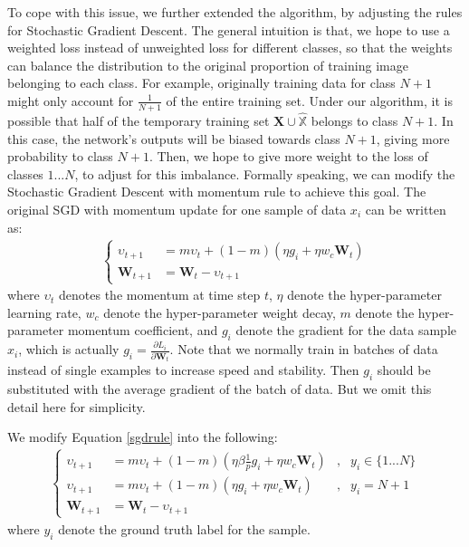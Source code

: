 To cope with this issue, we further extended the algorithm, by adjusting the rules for Stochastic Gradient Descent. The general intuition is that, we hope to use a weighted loss instead of unweighted loss for different classes, so that the weights can balance the distribution to the original proportion of training image belonging to each class. For example, originally training data for class $N+1$ might only account for $\frac{1}{N+1}$ of the entire training set. Under our algorithm, it is possible that half of the temporary training set $\mathbf{X} \cup \hat{\mathbb{X}}$ belongs to class $N+1$. In this case, the network's outputs will be biased towards class $N+1$, giving more probability to class $N+1$. Then, we hope to give more weight to the loss of classes $1...N$, to adjust for this imbalance. Formally speaking, we can modify the Stochastic Gradient Descent with momentum rule to achieve this goal. The original SGD with momentum update for one sample of data $x_i$ can be written as:
\begin{align}
\left\{
\begin{aligned}
	\upsilon_{t+1} &= m\upsilon_t + (1-m)\left( \eta g_i + \eta w_c \mathbf{W}_t \right)\\
	\mathbf{W}_{t+1} &= \mathbf{W}_{t} - \upsilon_{t+1}
\end{aligned}
\right.
\label{sgdrule}
\end{align}
where $\upsilon_t$ denotes the momentum at time step $t$, $\eta$ denote the hyper-parameter learning rate, $w_c$ denote the hyper-parameter weight decay, $m$ denote the hyper-parameter momentum coefficient, and $g_i$ denote the gradient for the data sample $x_i$, which is actually $g_i = \frac{\partial L_i}{\partial \mathbf{W}_t}$. Note that we normally train in batches of data instead of single examples to increase speed and stability. Then $g_i$ should be substituted with the average gradient of the batch of data. But we omit this detail here for simplicity.

We modify Equation \ref{sgdrule} into the following:
\begin{align}
\left\{
\begin{aligned}
\upsilon_{t+1} &= m\upsilon_t + (1-m)\left( \eta\beta\frac{1}{p} g_i + \eta w_c \mathbf{W}_t \right)&, &   y_i \in \{1...N\}\\
\upsilon_{t+1} &= m\upsilon_t + (1-m)\left( \eta g_i + \eta w_c \mathbf{W}_t \right)&, &   y_i = N+1\\
\mathbf{W}_{t+1} &= \mathbf{W}_{t} - \upsilon_{t+1}
\end{aligned}
\right.
\label{sgdrule2}
\end{align}
where $y_i$ denote the ground truth label for the sample.

